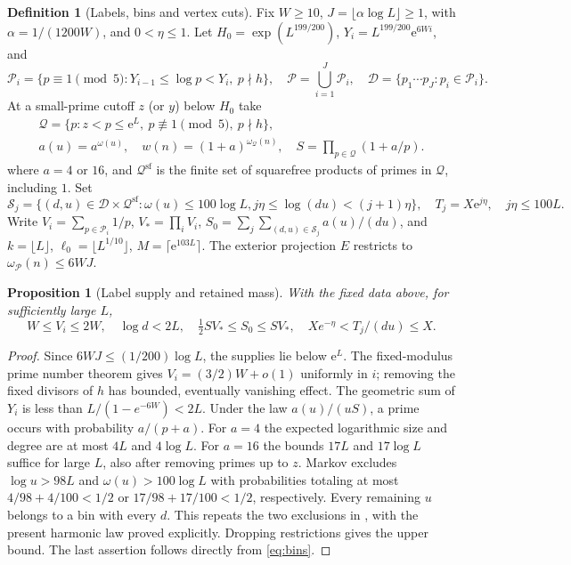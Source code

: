 \documentclass[11pt]{article}
\newtheorem{proposition}[theorem]{Proposition}
\theoremstyle{definition}
\newtheorem{definition}[theorem]{Definition}
\newcommand{\e}{\mathrm e}
\newcommand{\Pset}{\mathcal P}
\theoremstyle{remark}
\numberwithin{equation}{section}
\newcommand{\Qset}{\mathcal Q}
\newcommand{\Dset}{\mathcal D}
\newcommand{\sfw}{\mathrm{sf}}
\begin{document}
\begin{definition}[Labels, bins and vertex cuts]\label{def:graph}
Fix $W\ge10$, $J=\lfloor\alpha\log L\rfloor\ge1$, with $\alpha=1/(1200W)$, and $0<\eta\le1$.
Let $H_0=\exp(L^{199/200})$, $Y_i=L^{199/200}\e^{6Wi}$, and
\begin{equation}\label{eq:prime-supplies}
 \Pset_i=\{p\equiv1\pmod5:Y_{i-1}\le\log p<Y_i,\ p\nmid h\},\quad
 \Pset=\bigcup_{i=1}^J\Pset_i,\quad
 \Dset=\{p_1\cdots p_J:p_i\in\Pset_i\}.
\end{equation}
At a small-prime cutoff $z$ (or $y$) below $H_0$ take
\begin{equation}\label{eq:padding-data}
\begin{gathered}
 \Qset=\{p:z<p\le\e^L,\ p\not\equiv1\pmod5,\ p\nmid h\},\\
 a(u)=a^{\omega(u)},\quad w(n)=(1+a)^{\omega_{\Qset}(n)},\quad S=\prod_{p\in\Qset}(1+a/p).
\end{gathered}
\end{equation}
where $a=4$ or $16$, and $\Qset^{\sfw}$ is the finite set of squarefree products of primes in $\Qset$, including $1$.
Set
\begin{equation}\label{eq:bins}
 \mathcal S_j=\{(d,u)\in\Dset\times\Qset^{\sfw}:\omega(u)\le100\log L,
 j\eta\le\log(du)<(j+1)\eta\},\quad T_j=X\e^{j\eta},\quad j\eta\le100L.
\end{equation}
Write $V_i=\sum_{p\in\Pset_i}1/p$, $V_*=\prod_iV_i$,
$S_0=\sum_j\sum_{(d,u)\in\mathcal S_j}a(u)/(du)$, and $k=\lfloor L\rfloor$,
$\ell_0=\lfloor L^{1/10}\rfloor$, $M=\lceil\e^{103L}\rceil$.
The exterior projection $E$ restricts to $\omega_{\Pset}(n)\le6WJ$.
\end{definition}

\begin{proposition}[Label supply and retained mass]\label{lem:mass}
With the fixed data above, for sufficiently large $L$,
\begin{equation}\label{eq:label-mass}
 W\le V_i\le2W,\quad \log d<2L,\quad
 \tfrac12SV_*\le S_0\le SV_*,\quad Xe^{-\eta}<T_j/(du)\le X.
\end{equation}
\end{proposition}
\begin{proof}
Since $6WJ\le(1/200)\log L$, the supplies lie below $\e^L$. The fixed-modulus prime number theorem
\cite[(2.2)--(2.3), pp.~8--9]{OpenAI007} gives
$V_i=(3/2)W+o(1)$ uniformly in $i$; removing the fixed divisors of $h$ has bounded, eventually vanishing effect.
The geometric sum of $Y_i$ is less than $L/(1-e^{-6W})<2L$.
Under the law $a(u)/(uS)$, a prime occurs with probability $a/(p+a)$.
For $a=4$ the expected logarithmic size and degree are at most $4L$ and $4\log L$.
For $a=16$ the bounds $17L$ and $17\log L$ suffice for large $L$, also after removing primes up to $z$.
Markov excludes $\log u>98L$ and $\omega(u)>100\log L$ with probabilities totaling at most
$4/98+4/100<1/2$ or $17/98+17/100<1/2$, respectively.
Every remaining $u$ belongs to a bin with every $d$. This repeats the two exclusions in
\cite[Lemma~2.2, pp.~8--9]{OpenAI007}, with the present harmonic law proved explicitly.
Dropping restrictions gives the upper bound. The last assertion follows directly from \eqref{eq:bins}.
\end{proof}
\end{document}
